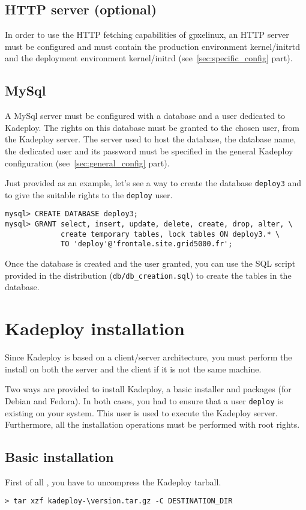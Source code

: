 \documentclass[a4wide,10pt,oneside]{book}
\newcommand{\version}{3.1.5}
\begin{document}
\subsection{HTTP server (optional)}
In order to use the HTTP fetching capabilities of gpxelinux, an HTTP server must be configured and must contain the production environment kernel/initrtd and the deployment environment kernel/initrd (see~\ref{sec:specific_config} part).

\subsection{MySql}
A MySql server must be configured with a database and a user dedicated to Kadeploy. The rights on this database must be granted to the chosen user, from the Kadeploy server. The server used to host the database, the database name, the dedicated user and its password must be specified in the general Kadeploy configuration (see~\ref{sec:general_config} part).

Just provided as an example, let's see a way to create the database \texttt{deploy3} and to give the suitable rights to the \texttt{deploy} user.
\begin{verbatim}
mysql> CREATE DATABASE deploy3;
mysql> GRANT select, insert, update, delete, create, drop, alter, \
             create temporary tables, lock tables ON deploy3.* \
             TO 'deploy'@'frontale.site.grid5000.fr';
\end{verbatim}

Once the database is created and the user granted, you can use the SQL script provided in the distribution (\texttt{db/db\_creation.sql}) to create the tables in the database.

\section{Kadeploy installation}
Since Kadeploy is based on a client/server architecture, you must perform the install on both the server and the client if it is not the same machine.

Two ways are provided to install Kadeploy, a basic installer and packages (for Debian and Fedora). In both cases, you had to ensure that a user \texttt{deploy} is existing on your system. This user is used to execute the Kadeploy server. Furthermore, all the installation operations must be performed with root rights.

\subsection{Basic installation}
First of all , you have to uncompress the Kadeploy tarball.
\begin{small}
\begin{Verbatim}[commandchars=\\\{\}]
> tar xzf kadeploy-\version.tar.gz -C DESTINATION_DIR
\end{Verbatim}
\end{small}
\end{document}
